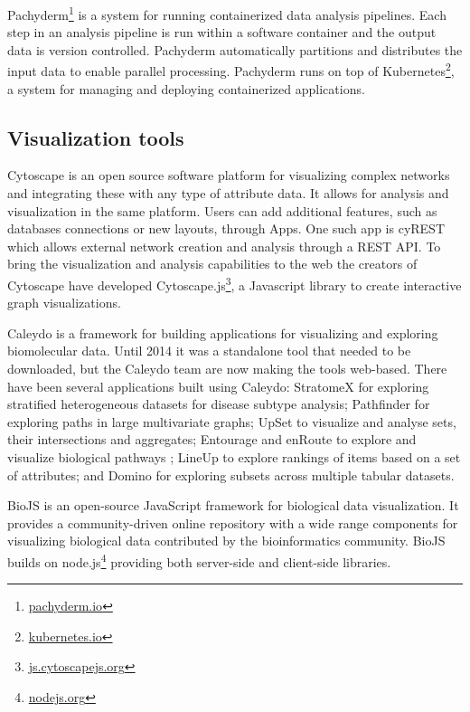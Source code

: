 Pachyderm\footnote{\url{pachyderm.io}} is a system for running containerized
data analysis pipelines. Each step in an analysis pipeline is run within a
software container and the output data is version controlled. Pachyderm
automatically partitions and distributes the input data to enable parallel
processing. Pachyderm runs on top of Kubernetes\footnote{\url{kubernetes.io}},
a system for managing and deploying containerized applications. 

\subsection*{Visualization tools} 
Cytoscape is an open source software platform for visualizing complex
networks and integrating these with any type of attribute
data\cite{shannon2003cytoscape}. It allows for analysis and visualization in the
same platform. Users can add additional features, such as databases connections
or new layouts, through Apps. One such app is cyREST which allows external
network creation and analysis through a REST API\cite{ono2015cyrest}.  To bring
the visualization and analysis capabilities to the web the creators of Cytoscape
have developed Cytoscape.js\footnote{\url{js.cytoscapejs.org}}, a Javascript
library to create interactive graph visualizations. 

Caleydo is a framework for building applications for visualizing and exploring
biomolecular data\cite{cleydo}. Until 2014 it was a standalone tool that needed
to be downloaded, but the Caleydo team are now making the tools web-based. There
have been several applications built using Caleydo: StratomeX for exploring
stratified heterogeneous datasets for disease subtype analysis\cite{stratomex};
Pathfinder for exploring paths in large multivariate graphs\cite{pathfinder};
UpSet to visualize and analyse sets, their intersections and
aggregates\cite{upset}; Entourage and enRoute to explore and visualize
biological pathways \cite{entourage}\cite{enroute}; LineUp to explore rankings
of items based on a set of attributes\cite{lineup}; and Domino for exploring
subsets across multiple tabular datasets\cite{domino}. 

BioJS is an open-source JavaScript framework for biological data
visualization.\cite{gomez2013biojs} It provides a community-driven online
repository with a wide range components for visualizing biological data
contributed by the bioinformatics community. BioJS builds on
node.js\footnote{\url{nodejs.org}} providing both server-side and client-side
libraries. 


